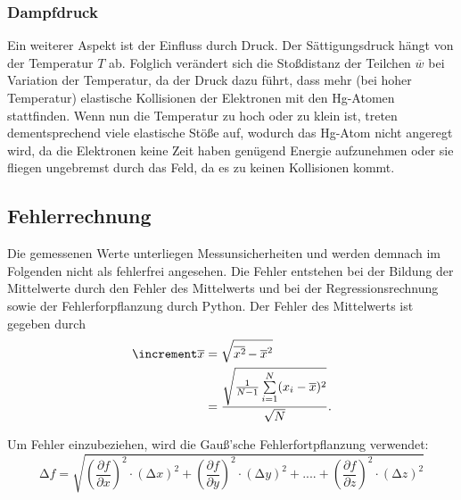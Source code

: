 \subsubsection{Dampfdruck}
Ein weiterer Aspekt ist der Einfluss durch Druck. Der Sättigungsdruck hängt von 
der Temperatur $T$ ab. Folglich verändert sich die Stoßdistanz der Teilchen 
$\overline{w}$ bei Variation der Temperatur, da der Druck dazu führt, dass 
mehr (bei hoher Temperatur) elastische Kollisionen der Elektronen mit den 
Hg-Atomen stattfinden. Wenn nun die Temperatur zu hoch oder zu klein ist, 
treten dementsprechend viele elastische Stöße auf, wodurch das Hg-Atom 
nicht angeregt wird, da die Elektronen keine Zeit haben genügend Energie 
aufzunehmen oder sie fliegen ungebremst durch das Feld, da es zu keinen 
Kollisionen kommt.

\subsection{Fehlerrechnung}
Die gemessenen Werte unterliegen Messunsicherheiten und werden demnach im
Folgenden nicht als fehlerfrei angesehen. Die Fehler entstehen bei der
Bildung der Mittelwerte durch den Fehler des Mittelwerts und bei der
Regressionsrechnung sowie der Fehlerforpflanzung durch Python.
Der Fehler des Mittelwerts ist gegeben durch 
\begin{equation}
    \begin{aligned}
        \increment \overline{x} &= \sqrt{\overline{x^2\kern-0.1em} - \overline{x}^2} \\
                            &= \frac{\sqrt{\frac{1}{N-1} \sum\limits_{i=1}^N (x_i - \overline{x})^2}}{\sqrt{N}}.
    \end{aligned}
\end{equation}

Um Fehler einzubeziehen, wird die Gauß'sche Fehlerfortpflanzung verwendet:
\begin{equation}
    \label{eqn:9}
    \increment f = \sqrt{\left(\frac{\partial f}{\partial x}\right)^2 \cdot \left(\increment x\right)^2 + \left(\frac{\partial f}{\partial y}\right)^2 \cdot \left(\increment y\right)^2 + .... + \left(\frac{\partial f}{\partial z}\right)^2 \cdot \left(\increment z\right)^2}
\end{equation}